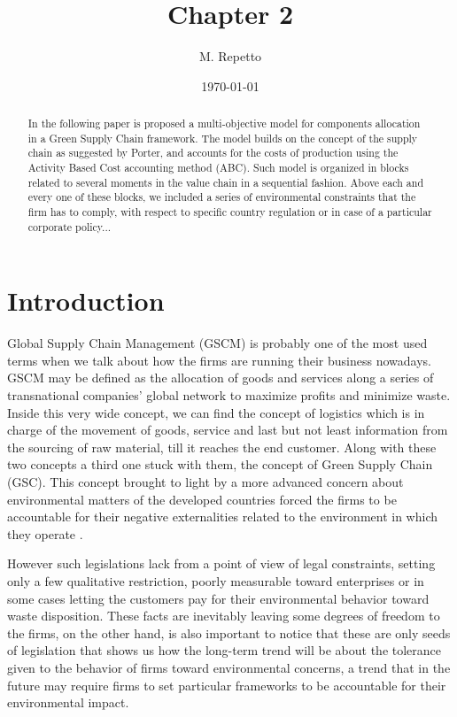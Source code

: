 \documentclass{article}
\begin{document}
\title{Chapter 2}

\author{M. Repetto}

\date{\today}

\maketitle

\begin{abstract}
In the following paper is proposed a multi-objective model for components allocation in a Green Supply Chain framework. The model builds on the concept of the supply chain as suggested by Porter, and accounts for the costs of production using the Activity Based Cost accounting method (ABC). Such model is organized in blocks related to several moments in the value chain in a sequential fashion. Above each and every one of these blocks, we included a series of environmental constraints that the firm has to comply, with respect to specific country regulation or in case of a particular corporate policy...
\end{abstract}

\section{Introduction}
Global Supply Chain Management (GSCM) is probably one of the most used terms when we talk about how the firms are running their business nowadays. GSCM may be defined as the allocation of goods and services along a series of transnational companies' global network to maximize profits and minimize waste. Inside this very wide concept, we can find the concept of logistics which is in charge of the movement of goods, service and last but not least information from the sourcing of raw material, till it reaches the end customer.
Along with these two concepts a third one stuck with them, the concept of Green Supply Chain (GSC). This concept brought to light by a more advanced concern about environmental matters of the developed countries forced the firms to be accountable for their negative externalities related to the environment in which they operate \cite{srivastava_green_2007}. 

However such legislations lack from a point of view of legal constraints, setting only a few qualitative restriction, poorly measurable toward enterprises or in some cases letting the customers pay for their environmental behavior toward waste disposition. These facts are inevitably leaving some degrees of freedom to the firms, on the other hand, is also important to notice that these are only seeds of legislation that shows us how the long-term trend will be about the tolerance given to the behavior of firms toward environmental concerns, a trend that in the future may require firms to set particular frameworks to be accountable for their environmental impact.
\end{document}
